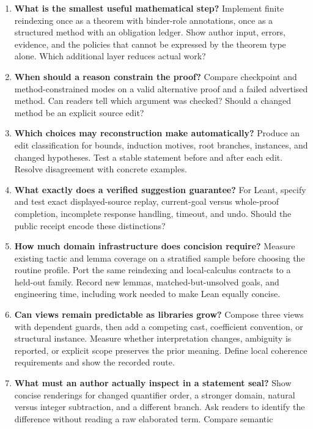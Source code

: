\documentclass[11pt,letterpaper]{article}
\begin{document}
\begin{enumerate}[label=\textbf{Q\arabic*.},itemsep=.65em]
\item \textbf{What is the smallest useful mathematical step?}
  Implement finite reindexing once as a theorem with binder-role annotations,
  once as a structured method with an obligation ledger. Show author input,
  errors, evidence, and the policies that cannot be expressed by the theorem
  type alone. Which additional layer reduces actual work?
\item \textbf{When should a reason constrain the proof?}
  Compare checkpoint and method-constrained modes on a valid alternative proof
  and a failed advertised method. Can readers tell which argument was checked?
  Should a changed method be an explicit source edit?
\item \textbf{Which choices may reconstruction make automatically?}
  Produce an edit classification for bounds, induction motives, root branches,
  instances, and changed hypotheses. Test a stable statement before and after
  each edit. Resolve disagreement with concrete examples.
\item \textbf{What exactly does a verified suggestion guarantee?}
  For Leant, specify and test exact displayed-source replay, current-goal versus
  whole-proof completion, incomplete response handling, timeout, and undo.
  Should the public receipt encode these distinctions?
\item \textbf{How much domain infrastructure does concision require?}
  Measure existing tactic and lemma coverage on a stratified sample before
  choosing the routine profile. Port the same reindexing and local-calculus
  contracts to a held-out family. Record new lemmas, matched-but-unsolved goals,
  and engineering time, including work needed to make Lean equally concise.
\item \textbf{Can views remain predictable as libraries grow?}
  Compose three views with dependent guards, then add a competing cast,
  coefficient convention, or structural instance. Measure whether interpretation
  changes, ambiguity is reported, or explicit scope preserves the prior meaning.
  Define local coherence requirements and show the recorded route.
\item \textbf{What must an author actually inspect in a statement seal?}
  Show concise renderings for changed quantifier order, a stronger domain,
  natural versus integer subtraction, and a different branch. Ask readers to
  identify the difference without reading a raw elaborated term. Compare semantic

\end{enumerate}
\end{document}

